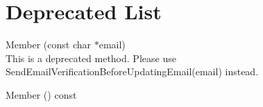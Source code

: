 \chapter{Deprecated List}
\hypertarget{deprecated}{}\label{deprecated}

\begin{DoxyRefList}
\item[Member \doxylink{classfirebase_1_1auth_1_1_user_a583b897e17a8f7160fcb97db74b6adc9}{firebase\+::auth\+::User\+::Update\+Email} (const char \texorpdfstring{$\ast$}{*}email)]\hfill \\
\label{deprecated__deprecated000001}%
%
This is a deprecated method. Please use Send\+Email\+Verification\+Before\+Updating\+Email(email) instead. 
\item[Member \doxylink{classfirebase_1_1auth_1_1_user_a1b92a94f9ab49b1715fda255ccee96e2}{firebase\+::auth\+::User\+::Update\+Email\+Last\+Result} () const]\hfill \\
\label{deprecated__deprecated000002}%
%
 

\end{DoxyRefList}
